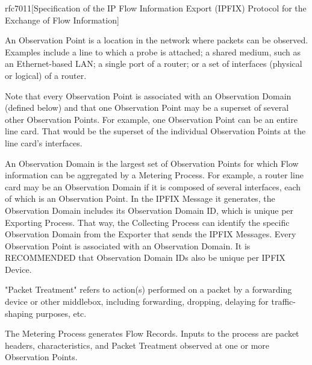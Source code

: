 \begin{displaycquote}{rfc7011}[Specification of the IP Flow Information Export (IPFIX) Protocol for the Exchange of Flow Information]

	\begin{description}[style=nextline]
		\item[Observation Point]
      An Observation Point is a location in the network where packets
      can be observed.  Examples include a line to which a probe is
      attached; a shared medium, such as an Ethernet-based LAN; a single
      port of a router; or a set of interfaces (physical or logical) of
      a router.

      Note that every Observation Point is associated with an
      Observation Domain (defined below) and that one Observation Point
      may be a superset of several other Observation Points.  For
      example, one Observation Point can be an entire line card.  That
      would be the superset of the individual Observation Points at the
      line card's interfaces.
      
		\item[Observation Domain]
      An Observation Domain is the largest set of Observation Points for
      which Flow information can be aggregated by a Metering Process.
      For example, a router line card may be an Observation Domain if it
      is composed of several interfaces, each of which is an Observation
      Point.  In the IPFIX Message it generates, the Observation Domain
      includes its Observation Domain ID, which is unique per Exporting
      Process.  That way, the Collecting Process can identify the
      specific Observation Domain from the Exporter that sends the IPFIX
      Messages.  Every Observation Point is associated with an
      Observation Domain.  It is RECOMMENDED that Observation Domain IDs
      also be unique per IPFIX Device.

		\item[Packet Treatment]
      "Packet Treatment" refers to action(s) performed on a packet by a
      forwarding device or other middlebox, including forwarding,
      dropping, delaying for traffic-shaping purposes, etc.

		\item[Metering Process] 

      The Metering Process generates Flow Records.  Inputs to the
      process are packet headers, characteristics, and Packet Treatment
      observed at one or more Observation Points.


\end{description}
\end{displaycquote}
